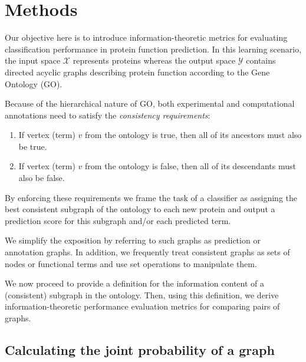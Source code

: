 \section{Methods} 
\label{sec:rumiMethods}
Our objective here is to introduce information-theoretic metrics for evaluating classification performance in protein function prediction. In this learning scenario, the input space $\mathcal{X}$ represents proteins whereas the output space $\mathcal{Y}$ contains directed acyclic graphs describing protein function according to the Gene Ontology (GO). 

Because of the hierarchical nature of GO, both experimental and computational annotations need to satisfy the \emph{consistency requirements}:

\begin{enumerate}[label=\roman*.,font=\itshape]
\item

If vertex (term) $v$ from the ontology is true, then all of its ancestors must also be true.

\item
If vertex (term) $v$ from the ontology is false, then all of its descendants must also be false.

\end{enumerate}
By enforcing these requirements we frame the task of a classifier as assigning the best consistent subgraph of the ontology to each new protein and output a prediction score for this subgraph and/or each predicted term. 

We simplify the exposition by referring to such graphs as prediction or annotation graphs. In addition, we frequently treat consistent graphs as sets of nodes or functional terms and use set operations to manipulate them. %

We now proceed to provide a definition for the information content of a (consistent) subgraph in the ontology. Then, using this definition, we derive information-theoretic performance evaluation metrics for comparing pairs of graphs.

\subsection{Calculating the joint probability of a graph}


